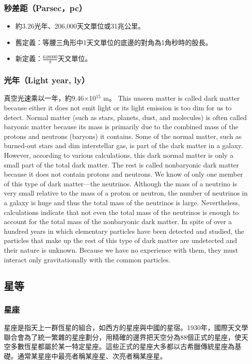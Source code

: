 \documentclass[a4paper,12pt]{report}
\begin{document}
\subsubsection{秒差距（Parsec，pc）}
\begin{itemize}
    \item 約3.26光年、206,000天文單位或31兆公里。
    \item 舊定義：等腰三角形中1天文單位的底邊的對角為1角秒時的股長。
    \item 新定義：$\frac{648000}{\pi}$天文單位。
\end{itemize}
\subsubsection{光年（Light year, ly）}
真空光速乘以一年，約9.46$\times$10$^{15}$ m。
This unseen matter is called dark matter because either it does not emit light or its light emission is too dim for us to detect. Normal matter (such as stars, planets, dust, and molecules) is often called baryonic matter because its mass is primarily due to the combined mass of the protons and neutrons (baryons) it contains. Some of the normal matter, such as burned-out stars and dim interstellar gas, is part of the dark matter in a galaxy. However, according to various calculations, this dark normal matter is only a small part of the total dark matter. The rest is called nonbaryonic dark matter because it does not contain protons and neutrons. We know of only one member of this type of dark matter—the neutrinos. Although the mass of a neutrino is very small relative to the mass of a proton or neutron, the number of neutrinos in a galaxy is huge and thus the total mass of the neutrinos is large. Nevertheless, calculations indicate that not even the total mass of the neutrinos is enough to account for the total mass of the nonbaryonic dark matter. In spite of over a hundred years in which elementary particles have been detected and studied, the particles that make up the rest of this type of dark matter are undetected and their nature is unknown. Because we have no experience with them, they must interact only gravitationally with the common particles.
\subsection{星等}
\subsubsection{星座}
星座是指天上一群恆星的組合，如西方的星座與中國的星宿。1930年，國際天文學聯合會為了統一繁雜的星座劃分，用精確的邊界把天空分為88個正式的星座，使天空多數恆星都屬於某一特定星座。這些正式的星座大多都以古希臘傳統星座為基礎。通常某星座中最亮者稱某座\text{\textalpha}星、次亮者稱某座\text{\textbeta}星。
\end{document}
